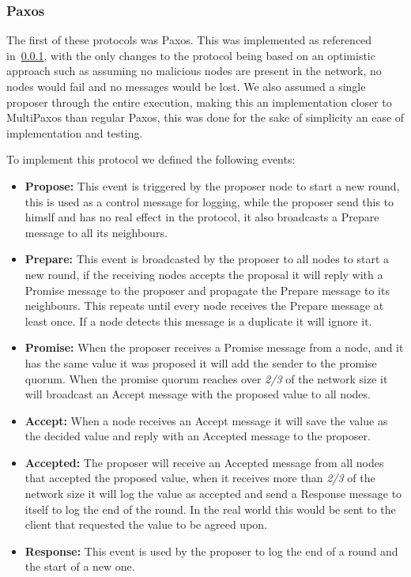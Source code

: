 \subsubsection{Paxos}\label{sub:paxos}

The first of these protocols was Paxos. This was implemented as referenced in~\ref{sub:paxos},
with the only changes to the protocol being based on an optimistic approach such as assuming no malicious nodes
are present in the network, no nodes would fail and no messages would be lost. We also assumed a single proposer
through the entire execution, making this an implementation closer to MultiPaxos
than regular Paxos, this was done for the sake of simplicity an ease of implementation and testing.

To implement this protocol we defined the following events:
\begin{itemize}
	\item \textbf{Propose: } This event is triggered by the proposer node to start a new round, this is used
  as a control message for logging, while the proposer send this to himslf and has no real effect in the protocol,
	it also broadcasts a Prepare message to all its neighbours.
  \item \textbf{Prepare: } This event is broadcasted by the proposer to all nodes to start a new round,
	if the receiving nodes accepts the proposal it will reply with a Promise message to the proposer and
	propagate the Prepare message to its neighbours. This repeats until every node receives the Prepare message
	at least once. If a node detects this message is a duplicate it will ignore it.
  \item \textbf{Promise: } When the proposer receives a Promise message from a node, and it has the same value it was proposed
	it will add the sender to the promise quorum. When the promise quorum reaches over \textit{2/3} of the network size it will
	broadcast an Accept message with the proposed value to all nodes.
  \item \textbf{Accept: } When a node receives an Accept message it will save the value as the decided value and reply
	with an Accepted message to the proposer.
  \item \textbf{Accepted: } The proposer will receive an Accepted message from all nodes that accepted the proposed value,
	when it receives more than \textit{2/3} of the network size it will log the value as accepted and send a Response message
	to itself to log the end of the round. In the real world this would be sent to the client that requested the value to be agreed upon.
  \item \textbf{Response: }	This event is used by the proposer to log the end of a round and the start of a new one.
\end{itemize}

